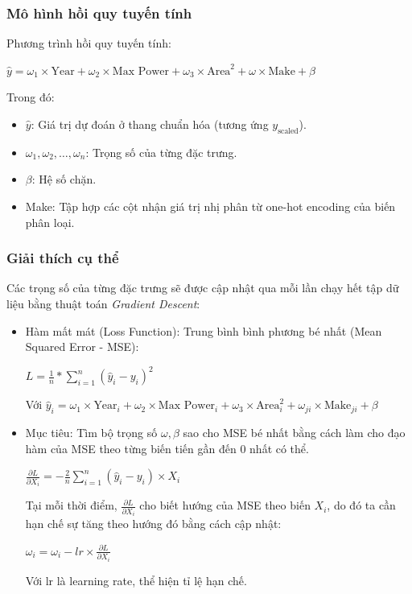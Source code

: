 \subsubsection{Mô hình hồi quy tuyến tính}

Phương trình hồi quy tuyến tính:
\begin{center}
$\hat{y} = \omega_1 \times \text{Year} + \omega_2 \times \text{Max Power} + \omega_3 \times \text{Area}^2 + \omega \times \text{Make} + \beta$
\end{center}

Trong đó:
\begin{itemize}
    \item $\hat{y}$: Giá trị dự đoán ở thang chuẩn hóa (tương ứng $y_{\text{scaled}}$).
    \item $\omega_1, \omega_2, \dots, \omega_n$: Trọng số của từng đặc trưng.
    \item $\beta$: Hệ số chặn.
    \item Make: Tập hợp các cột nhận giá trị nhị phân từ one-hot encoding của biến phân loại.
\end{itemize}

\subsubsection{Giải thích cụ thể}
Các trọng số của từng đặc trưng sẽ được cập nhật qua mỗi lần chạy hết tập dữ liệu bằng thuật toán \textit{Gradient Descent}:
\begin{itemize}
    \item Hàm mất mát (Loss Function): Trung bình bình phương bé nhất (Mean Squared Error - MSE):
    \begin{center}
    $L=\frac{1}{n}*\sum^n_{i=1}(\hat{y}_i-y_i)^2$
    \end{center}
    
    Với $\hat{y}_i = \omega_1 \times \text{Year}_i + \omega_2 \times \text{Max Power}_i + \omega_3 \times \text{Area}^2_i + \omega_{ji} \times \text{Make}_{ji} + \beta$
    \item Mục tiêu: Tìm bộ trọng số $\omega, \beta$ sao cho MSE bé nhất bằng cách làm cho đạo hàm của MSE theo từng biến tiến gần đến 0 nhất có thể.
    \begin{center}
    $\frac{\partial L}{\partial X_i}=-\frac{2}{n}\sum^n_{i=1}(\hat{y}_i-y_i)\times X_i$
    \end{center}
    
    Tại mỗi thời điểm, $\frac{\partial L}{\partial X_i}$ cho biết hướng của MSE theo biến $X_i$, do đó ta cần hạn chế sự tăng theo hướng đó bằng cách cập nhật:
    \begin{center}
    $\omega_i = \omega_i - lr \times\frac{\partial L}{\partial X_i}$
    \end{center}
    Với lr là learning rate, thể hiện tỉ lệ hạn chế.
\end{itemize}

